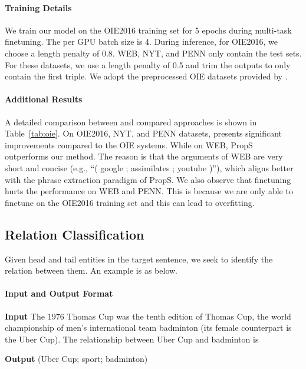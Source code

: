 \paragraph{Training Details}
We train our model on the OIE2016 training set for 5 epochs during multi-task finetuning. The per GPU batch size is 4. During inference, for OIE2016, we choose a length penalty of 0.8. WEB, NYT, and PENN only contain the test sets. For these datasets, we use a length penalty of 0.5 and trim the outputs to only contain the first triple. We adopt the preprocessed OIE datasets provided by \citet{stanovsky2018supervised}.

\paragraph{Additional Results}
A detailed comparison between \method and compared approaches is shown in Table~\ref{tab:oie}. On OIE2016, NYT, and PENN datasets, \method presents significant improvements compared to the OIE systems. While on WEB, PropS~\cite{stanovsky2016getting} outperforms our method. The reason is that the arguments of WEB are very short and concise (e.g., ``( google ; assimilates ; youtube )''), which aligns better with the phrase extraction paradigm of PropS. We also observe that finetuning hurts the performance on WEB and PENN. This is because we are only able to finetune \method on the OIE2016 training set and this can lead to overfitting.

\subsection{Relation Classification}
Given head and tail entities in the target sentence, we seek to identify the relation between them. An example is as below.

\paragraph{Input and Output Format}
\begin{enumerate*}
    \item[] {\bf Input} The 1976 Thomas Cup was the tenth edition of Thomas Cup, the world championship of men's international team badminton (its female counterpart is the Uber Cup). The relationship between Uber Cup and badminton is
    \item[] {\bf Output} (Uber Cup; sport; badminton)
\end{enumerate*}

